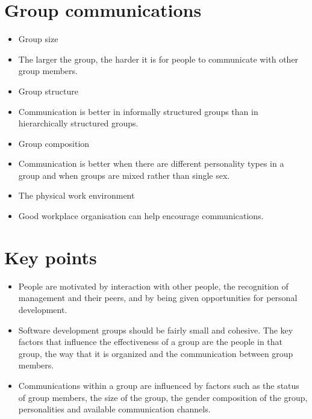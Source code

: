 \section{ Group communications}
\begin{itemize}

\item Group size

  \item The larger the group, the harder it is for people to communicate with other group members.

\item Group structure

  \item Communication is better in informally structured groups than in hierarchically structured groups.

\item Group composition

  \item Communication is better when there are different personality types in a group and when groups are mixed rather than single sex.

\item The physical work environment

  \item Good workplace organisation can help encourage communications.

\end{itemize}
\section{ Key points}
\begin{itemize}

\item People are motivated by interaction with other people, the recognition of management and their peers, and by being given opportunities for personal development.

\item Software development groups should be fairly small and cohesive. The key factors that influence the effectiveness of a group are the people in that group, the way that it is organized and the communication between group members.

\item Communications within a group are influenced by factors such as the status of group members, the size of the group, the gender composition of the group, personalities and available communication channels.
\end{itemize}
